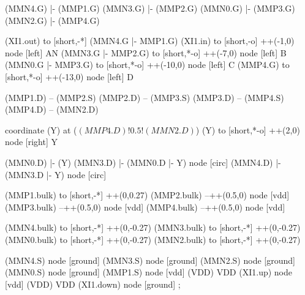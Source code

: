 \begin{circuitikz}[american]

	(MMN4.G) |- (MMP1.G)
	(MMN3.G) |- (MMP2.G)
	(MMN0.G) |- (MMP3.G)
	(MMN2.G) |- (MMP4.G)
	
	(XI1.out) to [short,-*] (MMN4.G |- MMP1.G)
	(XI1.in) to [short,-o] ++(-1,0) node [left] {AN}
	(MMN3.G |- MMP2.G) to [short,*-o] ++(-7,0) node [left] {B}
	(MMN0.G |- MMP3.G) to [short,*-o] ++(-10,0) node [left] {C}
	(MMP4.G) to [short,*-o] ++(-13,0) node [left] {D}	
	
	(MMP1.D) -- (MMP2.S)
	(MMP2.D) -- (MMP3.S)	
	(MMP3.D) -- (MMP4.S)
	(MMP4.D) -- (MMN2.D)
	
	coordinate (Y) at ($(MMP4.D)!0.5!(MMN2.D)$)
	(Y) to [short,*-o] ++(2,0) node [right] {Y}
	
	(MMN0.D) |- (Y)
	(MMN3.D) |- (MMN0.D |- Y) node [circ] {}
	(MMN4.D) |- (MMN3.D |- Y) node [circ] {}
	
	(MMP1.bulk) to [short,-*] ++(0,0.27)
	(MMP2.bulk) --++(0.5,0) node [vdd] {}
	(MMP3.bulk) --++(0.5,0) node [vdd] {}
	(MMP4.bulk) --++(0.5,0) node [vdd] {}
	
	(MMN4.bulk) to [short,-*] ++(0,-0.27)
	(MMN3.bulk) to [short,-*] ++(0,-0.27)
	(MMN0.bulk) to [short,-*] ++(0,-0.27)
	(MMN2.bulk) to [short,-*] ++(0,-0.27)


	(MMN4.S) node [ground] {}
	(MMN3.S) node [ground] {}
	(MMN2.S) node [ground] {}
	(MMN0.S) node [ground] {}
	(MMP1.S) node [vdd] (VDD) {VDD}
	(XI1.up) node [vdd] (VDD) {VDD}
	(XI1.down) node [ground] {}
;

\end{circuitikz}
